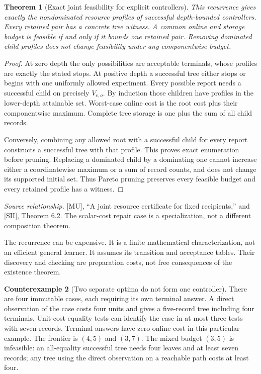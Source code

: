 \documentclass[11pt,oneside,openany]{book}
\newtheorem{theorem}{Theorem}[chapter]
\theoremstyle{definition}\newtheorem{definition}[theorem]{Definition}
\newtheorem{counterexample}[theorem]{Counterexample}
\newcommand{\source}[1]{\par{\small\textit{Source relationship.} #1}\par}
\begin{document}
\begin{theorem}[Exact joint feasibility for explicit controllers]\label{r:inquiry}
This recurrence gives exactly the nondominated resource profiles of successful depth-bounded controllers. Every retained pair has a concrete tree witness. A common online and storage budget is feasible if and only if it bounds one retained pair. Removing dominated child profiles does not change feasibility under any componentwise budget.
\end{theorem}
\begin{proof}
At zero depth the only possibilities are acceptable terminals, whose profiles are exactly the stated stops. At positive depth a successful tree either stops or begins with one uniformly allowed experiment. Every possible report needs a successful child on precisely $V_{e,o}$. By induction those children have profiles in the lower-depth attainable set. Worst-case online cost is the root cost plus their componentwise maximum. Complete tree storage is one plus the sum of all child records.

Conversely, combining any allowed root with a successful child for every report constructs a successful tree with that profile. This proves exact enumeration before pruning. Replacing a dominated child by a dominating one cannot increase either a coordinatewise maximum or a sum of record counts, and does not change its supported initial set. Thus Pareto pruning preserves every feasible budget and every retained profile has a witness.
\end{proof}
\source{[MU], ``A joint resource certificate for fixed recipients,'' and [SII], Theorem 6.2. The scalar-cost repair case is a specialization, not a different composition theorem.}

The recurrence can be expensive. It is a finite mathematical characterization, not an efficient general learner. It assumes its transition and acceptance tables. Their discovery and checking are preparation costs, not free consequences of the existence theorem.

\begin{counterexample}[Two separate optima do not form one controller]\label{ce:pareto}
There are four immutable cases, each requiring its own terminal answer. A direct observation of the case costs four units and gives a five-record tree including four terminals. Unit-cost equality tests can identify the case in at most three tests with seven records. Terminal answers have zero online cost in this particular example. The frontier is $(4,5)$ and $(3,7)$. The mixed budget $(3,5)$ is infeasible: an all-equality successful tree needs four leaves and at least seven records; any tree using the direct observation on a reachable path costs at least four.
\end{counterexample}
\end{document}
